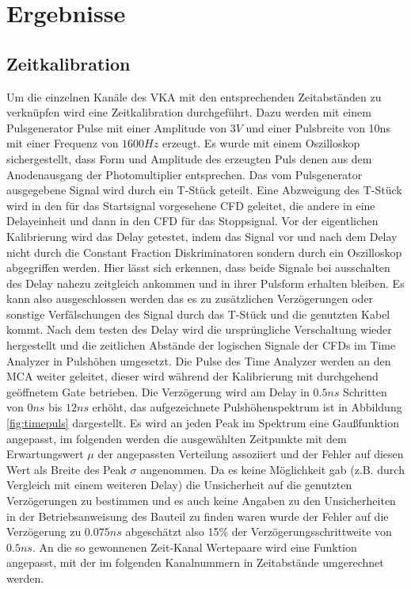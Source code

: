 \documentclass[a4paper,12pt]{article}
\begin{document}
\section{Ergebnisse}
	\subsection{Zeitkalibration}
		Um die einzelnen Kanäle des VKA mit den entsprechenden Zeitabständen zu verknüpfen wird eine Zeitkalibration durchgeführt. Dazu werden
		mit einem Pulsgenerator Pulse mit einer Amplitude von $3\si{V}$ und einer Pulsbreite von 10ns mit einer Frequenz von $1600\si{Hz}$ erzeugt.
		Es wurde mit einem Oszilloskop sichergestellt, dass Form und Amplitude des erzeugten Puls denen aus dem Anodenausgang der Photomultiplier 
		entsprechen. Das vom Pulsgenerator ausgegebene Signal wird durch ein T-Stück geteilt. Eine Abzweigung des T-Stück wird in den für das Startsignal vorgesehene 
		CFD geleitet, die andere in eine Delayeinheit und dann in den CFD für das Stoppsignal. Vor der eigentlichen Kalibrierung wird das Delay getestet, indem
		das Signal vor und nach dem Delay nicht durch die Constant Fraction Diskriminatoren sondern durch ein Oszilloskop abgegriffen werden. Hier lässt sich erkennen,
		dass beide Signale bei ausschalten des Delay nahezu zeitgleich ankommen und in ihrer Pulsform erhalten bleiben. Es kann also ausgeschlossen werden das es zu 
		zusätzlichen Verzögerungen oder sonstige Verfälschungen des Signal durch das T-Stück und die genutzten Kabel kommt.
		Nach dem testen des Delay wird die ursprüngliche Verschaltung wieder hergestellt und die zeitlichen Abstände der logischen Signale der CFDs im Time Analyzer
		in Pulshöhen umgesetzt. Die Pulse des Time Analyzer werden an den MCA weiter geleitet, dieser wird während der Kalibrierung mit
		durchgehend geöffnetem Gate betrieben. Die Verzögerung wird am Delay in $0.5\si{ns}$ Schritten von $0\si{ns}$ bis $12\si{ns}$ erhöht, das aufgezeichnete Pulshöhenspektrum 
		ist in Abbildung \ref{fig:timepuls} dargestellt. Es wird an jeden Peak im Spektrum eine Gaußfunktion angepasst, im folgenden werden die ausgewählten Zeitpunkte mit
		dem Erwartungswert $\mu$ der angepassten Verteilung assoziiert und der Fehler auf diesen Wert als Breite des Peak $\sigma$ angenommen. Da es keine Möglichkeit gab 
		(z.B. durch Vergleich mit einem weiteren Delay) die Unsicherheit auf die genutzten Verzögerungen zu bestimmen und es auch keine Angaben zu
		den Unsicherheiten in der Betriebsanweisung des Bauteil zu finden waren wurde der Fehler auf die Verzögerung zu $0.075\si{ns}$ abgeschätzt also 
		15\% der Verzögerungsschrittweite von $0.5\si{ns}$. An die so gewonnenen Zeit-Kanal Wertepaare wird eine Funktion angepasst, mit der im folgenden 
		Kanalnummern in Zeitabstände umgerechnet werden. 
		
\end{document}
